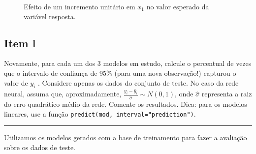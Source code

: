\documentclass[
  a4paperpaper,
]{article}
\begin{document}
\begin{figure}[H]


\caption{\label{fig-efeitox1}Efeito de um incremento unitário em \(x_1\)
no valor esperado da variável resposta.}

\end{figure}%

\subsection{Item l}\label{item-l}

Novamente, para cada um dos 3 modelos em estudo, calcule o percentual de
vezes que o intervalo de confiança de 95\% (para uma nova observação!)
capturou o valor de \(y_i\) . Considere apenas os dados do conjunto de
teste. No caso da rede neural, assuma que, aproximadamente,
\(\frac{y_i - \hat{y}_i}{\hat{\sigma}} \sim N (0, 1)\), onde
\(\hat{\sigma}\) representa a raiz do erro quadrático médio da rede.
Comente os resultados. Dica: para os modelos lineares, use a função
\texttt{predict(mod,\ interval="prediction")}.

\begin{center}\rule{0.5\linewidth}{0.5pt}\end{center}

Utilizamos os modelos gerados com a base de treinamento para fazer a
avaliação sobre os dados de teste.
\end{document}
